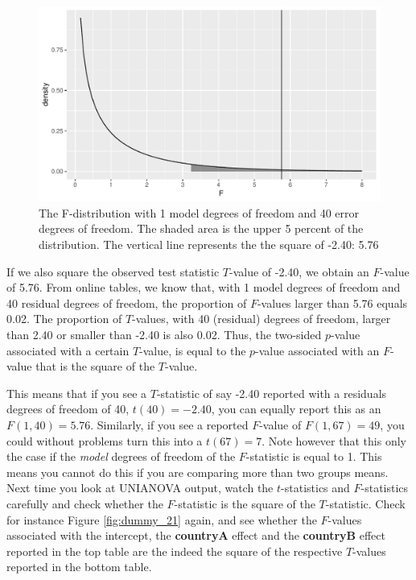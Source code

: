 \documentclass[]{book}\usepackage[]{graphicx}\usepackage[]{color}
\makeatletter
\def\maxwidth{ %
  \ifdim\Gin@nat@width>\linewidth
    \linewidth
  \else
    \Gin@nat@width
  \fi
}
\newenvironment{knitrout}{}{} %
\makeatother
\begin{document}
\begin{knitrout}
\color{fgcolor}\begin{figure}

{\centering \includegraphics[width=\maxwidth]{figure/dummy_25-1} 

}

\caption[The F-distribution with 1 model degrees of freedom and 40 error degrees of freedom]{The F-distribution with 1 model degrees of freedom and 40 error degrees of freedom. The shaded area is the upper 5 percent of the distribution. The vertical line represents the the square of -2.40: 5.76}\label{fig:dummy_25}
\end{figure}


\end{knitrout}


If we also square the observed test statistic $T$-value of -2.40, we obtain an $F$-value of 5.76. From online tables, we know that, with 1 model degrees of freedom and 40 residual degrees of freedom, the proportion of $F$-values larger than 5.76 equals 0.02. The proportion of $T$-values, with 40 (residual) degrees of freedom, larger than 2.40 or smaller than -2.40 is also 0.02. Thus, the two-sided $p$-value associated with a certain $T$-value, is equal to the $p$-value associated with an $F$-value that is the square of the $T$-value. 

This means that if you see a $T$-statistic of say -2.40 reported with a residuals degrees of freedom of 40, $t(40)=-2.40$, you can equally report this as an $F(1,40)=5.76$. Similarly, if you see a reported $F$-value of $F(1,67)=49$, you could without problems turn this into a $t(67)=7$. Note however that this only the case if the \textit{model} degrees of freedom of the $F$-statistic is equal to 1. This means you cannot do this if you are comparing more than two groups means. Next time you look at UNIANOVA output, watch the $t$-statistics and $F$-statistics carefully and check whether the $F$-statistic is the square of the $T$-statistic. Check for instance Figure \ref{fig:dummy_21} again, and see whether the $F$-values associated with the intercept, the \textbf{countryA} effect and the \textbf{countryB} effect reported in the top table are the indeed the square of the respective $T$-values reported in the bottom table. 
\end{document}

